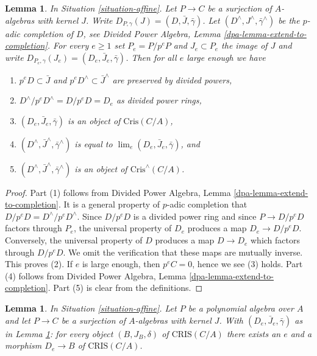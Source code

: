 \documentclass{stacks-project}
\theoremstyle{plain}
\newtheorem{lemma}[subsection]{Lemma}
\theoremstyle{definition}
\theoremstyle{remark}
\numberwithin{equation}{subsection}
\def\lim{\mathop{\mathrm{lim}}\nolimits}
\begin{document}
\begin{lemma}
\label{lemma-list-properties}
In Situation \ref{situation-affine}.
Let $P \to C$ be a surjection of $A$-algebras with kernel $J$.
Write $D_{P, \gamma}(J) = (D, \bar J, \bar\gamma)$.
Let $(D^\wedge, J^\wedge, \bar\gamma^\wedge)$ be the
$p$-adic completion of $D$, see
Divided Power Algebra, Lemma \ref{dpa-lemma-extend-to-completion}.
For every $e \geq 1$ set $P_e = P/p^eP$ and $J_e \subset P_e$
the image of $J$ and write
$D_{P_e, \gamma}(J_e) = (D_e, \bar J_e, \bar\gamma)$.
Then for all $e$ large enough we have
\begin{enumerate}
\item $p^eD \subset \bar J$ and $p^eD^\wedge \subset \bar J^\wedge$
are preserved by divided powers,
\item $D^\wedge/p^eD^\wedge = D/p^eD = D_e$ as divided power rings,
\item $(D_e, \bar J_e, \bar\gamma)$ is an object of $\text{Cris}(C/A)$,
\item $(D^\wedge, \bar J^\wedge, \bar\gamma^\wedge)$ is equal to
$\lim_e (D_e, \bar J_e, \bar\gamma)$, and
\item $(D^\wedge, \bar J^\wedge, \bar\gamma^\wedge)$ is an object of
$\text{Cris}^\wedge(C/A)$.
\end{enumerate}
\end{lemma}

\begin{proof}
Part (1) follows from
Divided Power Algebra, Lemma \ref{dpa-lemma-extend-to-completion}.
It is a general property of $p$-adic completion that
$D/p^eD = D^\wedge/p^eD^\wedge$. Since $D/p^eD$ is a divided power ring
and since $P \to D/p^eD$ factors through $P_e$, the universal property of
$D_e$ produces a map $D_e \to D/p^eD$. Conversely, the universal property
of $D$ produces a map $D \to D_e$ which factors through $D/p^eD$. We omit
the verification that these maps are mutually inverse. This proves (2).
If $e$ is large enough, then $p^eC = 0$, hence we see (3) holds.
Part (4) follows from
Divided Power Algebra, Lemma \ref{dpa-lemma-extend-to-completion}.
Part (5) is clear from the definitions.
\end{proof}

\begin{lemma}
\label{lemma-set-generators}
In Situation \ref{situation-affine}.
Let $P$ be a polynomial algebra over $A$ and let
$P \to C$ be a surjection of $A$-algebras with kernel $J$.
With $(D_e, \bar J_e, \bar\gamma)$ as in Lemma \ref{lemma-list-properties}:
for every object $(B, J_B, \delta)$ of $\text{CRIS}(C/A)$ there
exists an $e$ and a morphism $D_e \to B$ of $\text{CRIS}(C/A)$.
\end{lemma}
\end{document}
